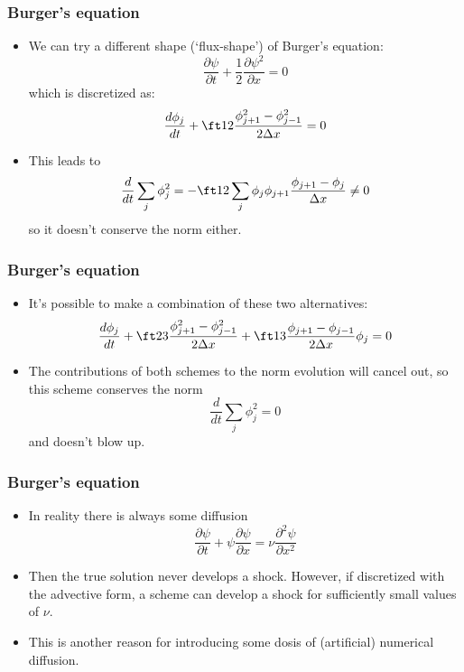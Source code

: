 \documentclass[aspectratio=149,9pt]{beamer}
\begin{document}
\begin{frame}
	\frametitle{Burger's equation}
	\begin{itemize}
		\item We can try a different shape (`flux-shape') of Burger's equation:
			\begin{equation*}
				\frac{\partial \psi}{\partial t} + \frac{1}{2} \frac{\partial \psi^2}{\partial x} = 0
			\end{equation*}
			which is discretized as:
			\begin{equation*}
				\frac{d \phi_j}{dt}  + \ft12 \frac{\phi_{j+1}^2 - \phi_{j-1}^2}{2 \Delta x} = 0
			\end{equation*}
		\item This leads to
			\begin{equation*}
				\frac{d}{dt} \sum_j \phi_j^2 =-\ft12	\sum_j \phi_j \phi_{j+1}\frac{\phi_{j+1} - \phi_j}{\Delta x}	\ne 0
			\end{equation*}
			so it doesn't conserve the norm either.
	\end{itemize}
\end{frame}
%
%
\begin{frame}
	\frametitle{Burger's equation}
	\begin{itemize}
		\item It's possible to make a combination of these two alternatives:
			\begin{equation*}
				\frac{d \phi_j}{dt}  + \ft23 \frac{\phi_{j+1}^2 - \phi_{j-1}^2}{2 \Delta x}  +\ft13 \frac{\phi_{j+1} - \phi_{j-1}}{2 \Delta x} \phi_j = 0
			\end{equation*}
		\item The contributions of both schemes to the norm evolution will cancel out, so this scheme conserves the norm
			\begin{equation*}
				\frac{d}{dt} \sum_j \phi_j^2 = 0
			\end{equation*}
			and doesn't blow up.
	\end{itemize}
\end{frame}
%
%
\begin{frame}
	\frametitle{Burger's equation}
	\begin{itemize}
		\item In reality there is always some diffusion
			\begin{equation*}
				\frac{\partial \psi}{\partial t} + \psi \frac{\partial \psi}{\partial x} = \nu \frac{\partial^2 \psi}{\partial x^2}
			\end{equation*}\vspace*{2ex}
		\item Then the true solution never develops a shock. However, if discretized with the advective form, a scheme can develop a shock for sufficiently small values of $\nu$.\vspace*{2ex}
		\item This is another reason for introducing some dosis of (artificial) numerical diffusion.
	\end{itemize}
\end{frame}
\end{document}
